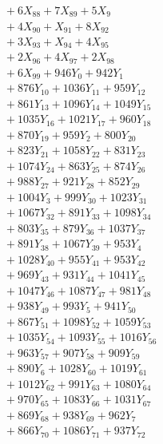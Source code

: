 \documentclass[a4paper,10pt]{article}
\begin{document}
{\begin{align}
&\quad  + 6X_{88} + 7X_{89} + 5X_{9} \\[0.5ex]
&\quad  + 4X_{90} + X_{91} + 8X_{92} \\[0.5ex]
&\quad  + 3X_{93} + X_{94} + 4X_{95} \\[0.5ex]
&\quad  + 2X_{96} + 4X_{97} + 2X_{98} \\[0.5ex]
&\quad  + 6X_{99} + 946Y_{0} + 942Y_{1} \\[0.5ex]
&\quad  + 876Y_{10} + 1036Y_{11} + 959Y_{12} \\[0.5ex]
&\quad  + 861Y_{13} + 1096Y_{14} + 1049Y_{15} \\[0.5ex]
&\quad  + 1035Y_{16} + 1021Y_{17} + 960Y_{18} \\[0.5ex]
&\quad  + 870Y_{19} + 959Y_{2} + 800Y_{20} \\[0.5ex]
&\quad  + 823Y_{21} + 1058Y_{22} + 831Y_{23} \\[0.5ex]
&\quad  + 1074Y_{24} + 863Y_{25} + 874Y_{26} \\[0.5ex]
&\quad  + 988Y_{27} + 921Y_{28} + 852Y_{29} \\[0.5ex]
&\quad  + 1004Y_{3} + 999Y_{30} + 1023Y_{31} \\[0.5ex]
&\quad  + 1067Y_{32} + 891Y_{33} + 1098Y_{34} \\[0.5ex]
&\quad  + 803Y_{35} + 879Y_{36} + 1037Y_{37} \\[0.5ex]
&\quad  + 891Y_{38} + 1067Y_{39} + 953Y_{4} \\[0.5ex]
&\quad  + 1028Y_{40} + 955Y_{41} + 953Y_{42} \\[0.5ex]
&\quad  + 969Y_{43} + 931Y_{44} + 1041Y_{45} \\[0.5ex]
&\quad  + 1047Y_{46} + 1087Y_{47} + 981Y_{48} \\[0.5ex]
&\quad  + 938Y_{49} + 993Y_{5} + 941Y_{50} \\[0.5ex]
&\quad  + 867Y_{51} + 1098Y_{52} + 1059Y_{53} \\[0.5ex]
&\quad  + 1035Y_{54} + 1093Y_{55} + 1016Y_{56} \\[0.5ex]
&\quad  + 963Y_{57} + 907Y_{58} + 909Y_{59} \\[0.5ex]
&\quad  + 890Y_{6} + 1028Y_{60} + 1019Y_{61} \\[0.5ex]
&\quad  + 1012Y_{62} + 991Y_{63} + 1080Y_{64} \\[0.5ex]
&\quad  + 970Y_{65} + 1083Y_{66} + 1031Y_{67} \\[0.5ex]
&\quad  + 869Y_{68} + 938Y_{69} + 962Y_{7} \\[0.5ex]
&\quad  + 866Y_{70} + 1086Y_{71} + 937Y_{72} \\[0.5ex]

\end{align}}
\end{document}
